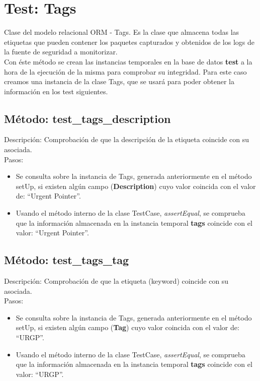 

\section{\quad Test: Tags}

Clase del modelo relacional ORM - Tags. Es la clase que almacena todas las etiquetas que pueden contener los paquetes capturados y obtenidos de los logs de la fuente de seguridad a monitorizar.\\

Con éste método se crean las instancias temporales en la base de datos \textbf{test} a la hora de la ejecución de la misma para comprobar su integridad. Para este caso creamos una instancia de la clase Tags, que se usará para poder obtener la información en los test siguientes.\\



\subsection{\quad Método: test\_tags\_description}

Descripción: Comprobación de que la descripción de la etiqueta coincide con su asociada.\\
Pasos:
\begin{itemize}
\item Se consulta sobre la instancia de Tags, generada anteriormente en el método setUp, si existen algún campo (\textbf{Description}) cuyo valor coincida con el valor de: ``Urgent Pointer''.
\item Usando el método interno de la clase TestCase, \emph{assertEqual}, se comprueba que la información almacenada en la instancia temporal \textbf{tags} coincide con el valor: ``Urgent Pointer''.
\end{itemize}



\subsection{\quad Método: test\_tags\_tag}

Descripción: Comprobación de que la etiqueta (keyword) coincide con su asociada.\\
Pasos:
\begin{itemize}
\item Se consulta sobre la instancia de Tags, generada anteriormente en el método setUp, si existen algún campo (\textbf{Tag}) cuyo valor coincida con el valor de: ``URGP''.
\item Usando el método interno de la clase TestCase, \emph{assertEqual}, se comprueba que la información almacenada en la instancia temporal \textbf{tags} coincide con el valor: ``URGP''.
\end{itemize}

